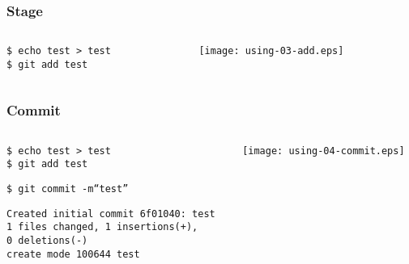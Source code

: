 \documentclass[english]{beamer}
\newcommand{\CMD}[1]{%
\texttt{\textcolor{code-green}{#1}}%
}
\newcommand{\cmd}[1]{%
\texttt{\textcolor{code-orange}{#1}}%
}
\newcommand{\fnt}[1]{%
\texttt{\textcolor{code-gray}{#1}}%
}
\begin{document}
\begin{frame}
\frametitle{Stage}
\begin{columns}[t]
        \begin{column}[T]{.5\textwidth}
                \cmd{\$ echo test > test} \\
                \CMD{\$ git add test}
        \end{column}
        \begin{column}[T]{.5\textwidth}
                \texttt{[image: using-03-add.eps]}
        \end{column}
\end{columns}
\end{frame}

\begin{frame}
\frametitle{Commit}
\begin{columns}[t]
        \begin{column}[T]{.5\textwidth}
                \cmd{\$ echo test > test} \\
                \CMD{\$ git add test}

                \vspace{.1\textheight}

                \CMD{\$ git commit -m``test''} \\
                {\tiny
                \fnt{Created initial commit 6f01040: test \\
                       1 files changed, 1 insertions(+), \\ 0 deletions(-) \\
                       create mode 100644 test}
                }
        \end{column}
        \begin{column}[T]{.5\textwidth}
                \texttt{[image: using-04-commit.eps]}
        \end{column}
\end{columns}
\end{frame}
\end{document}
